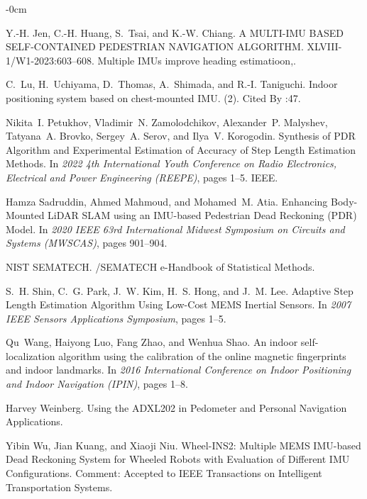 \documentclass[engproc,conferenceproceedings,submit,pdftex,moreauthors]{Definitions/mdpi}
\begin{document}
\begin{adjustwidth}{-\extralength}{0cm}
\begin{thebibliography}{999}
Y.-H. Jen, C.-H. Huang, S.~Tsai, and K.-W. Chiang.
\newblock A {{MULTI-IMU BASED SELF-CONTAINED PEDESTRIAN NAVIGATION ALGORITHM}}.
\newblock XLVIII-1/W1-2023:603--608.
\newblock Multiple IMUs improve heading estimatioon,.

C.~Lu, H.~Uchiyama, D.~Thomas, A.~Shimada, and R.-I. Taniguchi.
\newblock Indoor positioning system based on chest-mounted {{IMU}}.
(2).
\newblock Cited By :47.

Nikita~I. Petukhov, Vladimir~N. Zamolodchikov, Alexander~P. Malyshev,
Tatyana~A. Brovko, Sergey~A. Serov, and Ilya~V. Korogodin.
\newblock Synthesis of {{PDR Algorithm}} and {{Experimental Estimation}} of
{{Accuracy}} of {{Step Length Estimation Methods}}.
\newblock In {\em 2022 4th {{International Youth Conference}} on {{Radio
			Electronics}}, {{Electrical}} and {{Power Engineering}} ({{REEPE}})}, pages
1--5. {IEEE}.

Hamza Sadruddin, Ahmed Mahmoud, and Mohamed~M. Atia.
\newblock Enhancing {{Body-Mounted LiDAR SLAM}} using an {{IMU-based Pedestrian
		Dead Reckoning}} ({{PDR}}) {{Model}}.
\newblock In {\em 2020 {{IEEE}} 63rd {{International Midwest Symposium}} on
	{{Circuits}} and {{Systems}} ({{MWSCAS}})}, pages 901--904.

NIST SEMATECH.
/{{SEMATECH}} e-{{Handbook}} of {{Statistical Methods}}.

S.~H. Shin, C.~G. Park, J.~W. Kim, H.~S. Hong, and J.~M. Lee.
\newblock Adaptive {{Step Length Estimation Algorithm Using Low-Cost MEMS
		Inertial Sensors}}.
\newblock In {\em 2007 {{IEEE Sensors Applications Symposium}}}, pages 1--5.

Qu~Wang, Haiyong Luo, Fang Zhao, and Wenhua Shao.
\newblock An indoor self-localization algorithm using the calibration of the
online magnetic fingerprints and indoor landmarks.
\newblock In {\em 2016 {{International Conference}} on {{Indoor Positioning}}
	and {{Indoor Navigation}} ({{IPIN}})}, pages 1--8.

Harvey Weinberg.
\newblock Using the {{ADXL202}} in {{Pedometer}} and {{Personal Navigation
		Applications}}.

Yibin Wu, Jian Kuang, and Xiaoji Niu.
\newblock Wheel-{{INS2}}: {{Multiple MEMS IMU-based Dead Reckoning System}} for
{{Wheeled Robots}} with {{Evaluation}} of {{Different IMU Configurations}}.
\newblock Comment: Accepted to IEEE Transactions on Intelligent Transportation
Systems.


\end{thebibliography}
\end{adjustwidth}
\end{document}
